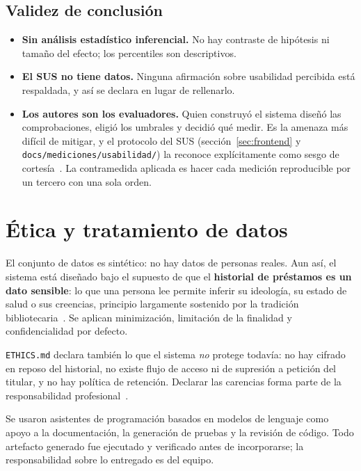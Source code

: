 \documentclass[11pt,a4paper]{article}
\begin{document}
\subsection{Validez de conclusión}

\begin{itemize}[leftmargin=*]
  \item \textbf{Sin análisis estadístico inferencial.} No hay contraste de
        hipótesis ni tamaño del efecto; los percentiles son descriptivos.
  \item \textbf{El SUS no tiene datos.} Ninguna afirmación sobre usabilidad
        percibida está respaldada, y así se declara en lugar de rellenarlo.
  \item \textbf{Los autores son los evaluadores.} Quien construyó el sistema
        diseñó las comprobaciones, eligió los umbrales y decidió qué medir. Es la
        amenaza más difícil de mitigar, y el protocolo del SUS
        (sección~\ref{sec:frontend} y \texttt{docs/mediciones/usabilidad/}) la
        reconoce explícitamente como sesgo de cortesía~\cite{nielsen1993usability}.
        La contramedida aplicada es hacer cada medición reproducible por un
        tercero con una sola orden.
\end{itemize}

\section{Ética y tratamiento de datos}

El conjunto de datos es sintético: no hay datos de personas reales. Aun así, el
sistema está diseñado bajo el supuesto de que el \textbf{historial de préstamos es
un dato sensible}: lo que una persona lee permite inferir su ideología, su estado
de salud o sus creencias, principio largamente sostenido por la tradición
bibliotecaria~\cite{ala2019privacy}. Se aplican minimización, limitación de la
finalidad y confidencialidad por defecto.

\texttt{ETHICS.md} declara también lo que el sistema \emph{no} protege todavía:
no hay cifrado en reposo del historial, no existe flujo de acceso ni de supresión
a petición del titular, y no hay política de retención. Declarar las carencias
forma parte de la responsabilidad profesional~\cite{acm2018code}.

Se usaron asistentes de programación basados en modelos de lenguaje como apoyo a
la documentación, la generación de pruebas y la revisión de código. Todo artefacto
generado fue ejecutado y verificado antes de incorporarse; la responsabilidad
sobre lo entregado es del equipo.
\end{document}

